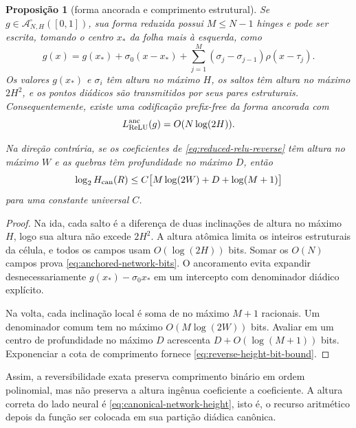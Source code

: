 \documentclass[11pt,a4paper]{article}
\newtheorem{proposition}[theorem]{Proposição}
\theoremstyle{definition}
\theoremstyle{remark}
\newcommand{\Aclass}{\mathcal{A}}
\begin{document}
\begin{proposition}[forma ancorada e comprimento estrutural]
\label{prop:anchored-relu-code}
Se $g\in\Aclass^\square_{N,H}([0,1])$, sua forma reduzida possui
$M\le N-1$ hinges e pode ser escrita, tomando o centro $x_*$ da folha mais à
esquerda, como
\begin{equation}
 g(x)=g(x_*)+\sigma_0(x-x_*)
      +\sum_{j=1}^{M}(\sigma_j-\sigma_{j-1})\rho(x-\tau_j).
 \label{eq:anchored-relu-form}
\end{equation}
Os valores $g(x_*)$ e $\sigma_i$ têm altura no máximo $H$, os saltos têm
altura no máximo $2H^2$, e os pontos diádicos são transmitidos por seus pares
estruturais. Consequentemente, existe uma codificação prefix-free da forma
ancorada com
\begin{equation}
 L_{\rm ReLU}^{\rm anc}(g)=O(N\log(2H)).
 \label{eq:anchored-network-bits}
\end{equation}

Na direção contrária, se os coeficientes de
\eqref{eq:reduced-relu-reverse} têm altura no máximo $W$ e as quebras têm
profundidade no máximo $D$, então
\begin{equation}
 \log_2 H_{\rm can}(R)
 \le C\bigl[M\log(2W)+D+\log(M+1)\bigr]
 \label{eq:reverse-height-bit-bound}
\end{equation}
para uma constante universal $C$.
\end{proposition}

\begin{proof}
Na ida, cada salto é a diferença de duas inclinações de altura no máximo
$H$, logo sua altura não excede $2H^2$. A altura atômica limita os inteiros
estruturais da célula, e todos os campos usam $O(\log(2H))$ bits. Somar os
$O(N)$ campos prova \eqref{eq:anchored-network-bits}. O ancoramento evita
expandir desnecessariamente $g(x_*)-\sigma_0x_*$ em um intercepto com
denominador diádico explícito.

Na volta, cada inclinação local é soma de no máximo $M+1$ racionais. Um
denominador comum tem no máximo $O(M\log(2W))$ bits. Avaliar em um centro de
profundidade no máximo $D$ acrescenta $D+O(\log(M+1))$ bits. Exponenciar a
cota de comprimento fornece \eqref{eq:reverse-height-bit-bound}.
\end{proof}

Assim, a reversibilidade exata preserva comprimento binário em ordem
polinomial, mas não preserva a altura ingênua coeficiente a coeficiente. A
altura correta do lado neural é \eqref{eq:canonical-network-height}, isto é,
o recurso aritmético depois da função ser colocada em sua partição diádica
canônica.
\end{document}
